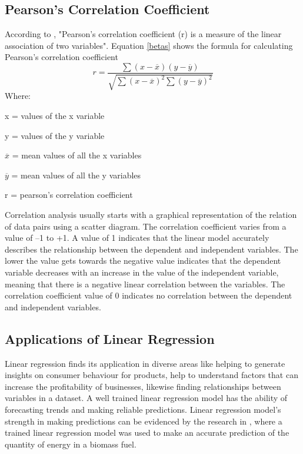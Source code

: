\documentclass[conference]{IEEEtran}
\begin{document}
\subsection{Pearson's Correlation Coefficient}
According to \cite{ref1_pearson}, "Pearson's correlation coefficient (r) is a measure of the linear association of two variables". Equation \eqref{betas} shows the formula for calculating Pearson's correlation coefficient 
	\begin{equation}
		r = \frac{\sum{}(x-\overline{x})(y-\overline{y})}{\sqrt{\sum{}(x-\overline{x})^2\sum{}(y-\overline{y})^2}}\label{betas}
	\end{equation}	
	Where:
	\begin{description}
		\item x = values of the x variable
		\item y = values of the y variable
		\item $\overline{x}$ = mean values of all the x variables
		\item $\overline{y}$ = mean values of all the y variables
		\item r = pearson's correlation coefficient
	\end{description}
	 
Correlation analysis usually starts with a graphical representation of the relation of data pairs using a scatter diagram. The correlation coefficient varies from a value of –1 to +1. A value of 1 indicates that the linear model accurately describes the relationship between the dependent and independent variables. The lower the value gets towards the negative value indicates that the dependent variable decreases with an increase in the value of the independent variable, meaning that there is a negative linear correlation between the variables.
The correlation coefficient value of 0 indicates no correlation between the dependent and independent variables.


\subsection{Applications of Linear Regression}
Linear regression finds its application in diverse areas like helping to generate insights on consumer behaviour for products, help to understand factors that can increase the profitability of businesses, likewise finding relationships between variables in a dataset.
A well trained linear regression model has the ability of forecasting trends and making reliable predictions. Linear regression model's strength in making predictions can be evidenced by the research in \cite{article_ighalo}, where a trained linear regression model was used to make an accurate prediction of the quantity of energy in a biomass fuel.
\end{document}
